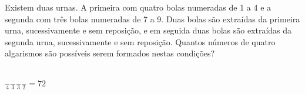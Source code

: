 \begin{ex}
 	Existem  duas urnas. A primeira com quatro bolas numeradas de 1 a 4 e a segunda com três bolas numeradas de 7 a 9. Duas bolas são extraídas da primeira urna, sucessivamente e sem reposição, e em seguida duas bolas são extraídas  da segunda urna, sucessivamente e sem reposição. Quantos números de quatro algarismos são possíveis serem formados nestas condições?
 	   \begin{sol}
 	     \phantom{A} \\
 	     $\frac{\phantom{A}}{4}\frac{\phantom{A}}{3}\frac{\phantom{A}}{3}\frac{\phantom{A}}{2}= 72$
 	   \end{sol}
\end{ex}